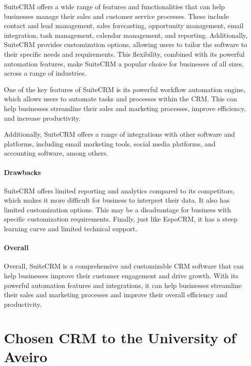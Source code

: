 \documentclass{article}
\begin{document}
SuiteCRM offers a wide range of features and functionalities that can help businesses manage their sales and customer service processes. These include contact and lead management, sales forecasting, opportunity management, email integration, task management, calendar management, and reporting. Additionally, SuiteCRM provides customization options, allowing users to tailor the software to their specific needs and requirements. This flexibility, combined with its powerful automation features, make SuiteCRM a popular choice for businesses of all sizes, across a range of industries.

One of the key features of SuiteCRM is its powerful workflow automation engine, which allows users to automate tasks and processes within the CRM. This can help businesses streamline their sales and marketing processes, improve efficiency, and increase productivity.

Additionally, SuiteCRM offers a range of integrations with other software and platforms, including email marketing tools, social media platforms, and accounting software, among others. 

\paragraph{Drawbacks}

SuiteCRM offers limited reporting and analytics compared to its competitors, which makes it more difficult for business to interpret their data. It also has limited customization options. This may be a disadvantage for business with specific customization requirements. Finally, just like EspoCRM, it has a steep learning curve and limited technical support.

\paragraph{Overall}

Overall, SuiteCRM is a comprehensive and customizable CRM software that can help businesses improve their customer engagement and drive growth. With its powerful automation features and integrations, it can help businesses streamline their sales and marketing processes and improve their overall efficiency and productivity.


\section{Chosen CRM to the University of Aveiro}
\end{document}
